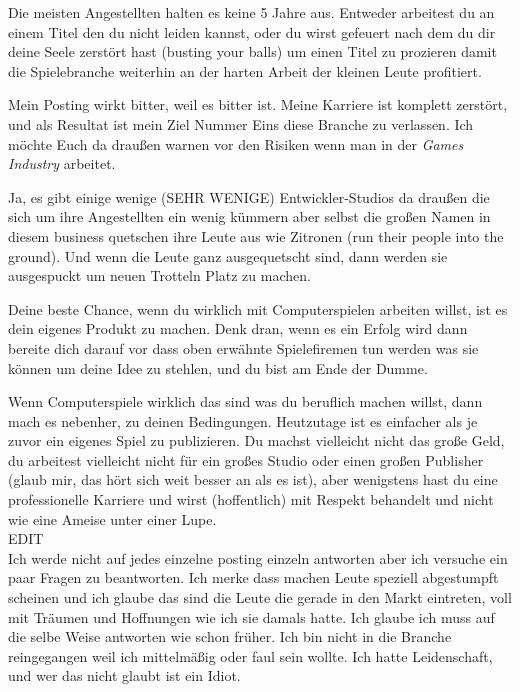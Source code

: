 Die meisten Angestellten halten es keine 5 Jahre aus. Entweder arbeitest du an einem Titel den du nicht leiden kannst, oder du wirst gefeuert nach dem du dir deine Seele zerstört hast (busting your balls) um einen Titel zu prozieren damit die Spielebranche weiterhin an der harten Arbeit der kleinen Leute profitiert.

Mein Posting wirkt bitter, weil es bitter ist. Meine Karriere ist komplett zerstört, und als Resultat ist mein Ziel Nummer Eins diese Branche zu verlassen. Ich möchte Euch da draußen warnen vor den Risiken wenn man in der \textit{Games Industry} arbeitet.

Ja, es gibt einige wenige (SEHR WENIGE) Entwickler-Studios da draußen die sich um ihre Angestellten ein wenig kümmern aber selbst die großen Namen in diesem business quetschen ihre Leute aus wie Zitronen (run their people into the ground). Und wenn die Leute ganz ausgequetscht sind, dann werden sie ausgespuckt um neuen Trotteln Platz zu machen.

Deine beste Chance, wenn du wirklich mit Computerspielen arbeiten willst, ist es dein eigenes Produkt zu machen. Denk dran, wenn es ein Erfolg wird dann bereite dich darauf vor dass oben erwähnte Spielefiremen tun werden was sie können um deine Idee zu stehlen, und du bist am Ende der Dumme. 

Wenn Computerspiele wirklich das sind was du beruflich machen willst, dann mach es nebenher, zu deinen Bedingungen. Heutzutage ist es einfacher als je zuvor ein eigenes Spiel zu publizieren. Du machst vielleicht nicht das große Geld, du arbeitest vielleicht nicht für ein großes Studio oder einen großen Publisher (glaub mir, das hört sich weit besser an als es ist), aber wenigstens hast du eine professionelle Karriere und wirst (hoffentlich) mit Respekt behandelt und nicht wie eine Ameise unter einer Lupe.\\

EDIT\\

Ich werde nicht auf jedes einzelne posting einzeln antworten aber ich versuche ein paar Fragen zu beantworten. Ich merke dass machen Leute speziell abgestumpft scheinen und ich glaube das sind die Leute die gerade in den Markt eintreten, voll mit Träumen und Hoffnungen wie ich sie damals hatte. Ich glaube ich muss auf die selbe Weise antworten wie schon früher. Ich bin nicht in die Branche reingegangen weil ich mittelmäßig oder faul sein wollte. Ich hatte Leidenschaft, und wer das nicht glaubt ist ein Idiot.

